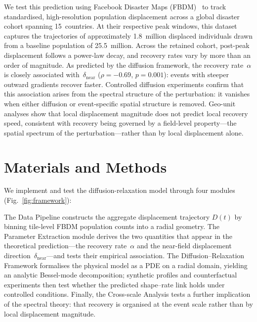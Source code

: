 \documentclass[11pt]{article}
\newcommand{\dnear}{\delta_{\mathrm{near}}}
\newcommand{\rhosp}{\rho}
\begin{document}
We test this prediction using Facebook Disaster Maps (FBDM)~\citep{Maas2019,Jia2020} to track standardised, high-resolution population displacement across a global disaster cohort spanning 15~countries. At their respective peak windows, this dataset captures the trajectories of approximately 1.8~million displaced individuals drawn from a baseline population of 25.5~million. Across the retained cohort, post-peak displacement follows a power-law decay, and recovery rates vary by more than an order of magnitude. As predicted by the diffusion framework, the recovery rate~$\alpha$ is closely associated with~$\dnear$ ($\rhosp = -0.69$, $p = 0.001$): events with steeper outward gradients recover faster. Controlled diffusion experiments confirm that this association arises from the spectral structure of the perturbation: it vanishes when either diffusion or event-specific spatial structure is removed. Geo-unit analyses show that local displacement magnitude does not predict local recovery speed, consistent with recovery being governed by a field-level property---the spatial spectrum of the perturbation---rather than by local displacement alone.


\section*{Materials and Methods}


We implement and test the diffusion-relaxation model through four modules (Fig.~\ref{fig:framework}):

The Data Pipeline constructs the aggregate displacement trajectory $D(t)$ by binning tile-level FBDM population counts into a radial geometry.
The Parameter Extraction module derives the two quantities that appear in the theoretical prediction---the recovery rate~$\alpha$ and the near-field displacement direction~$\dnear$---and tests their empirical association.
The Diffusion--Relaxation Framework formalises the physical model as a PDE on a radial domain, yielding an analytic Bessel-mode decomposition; synthetic profiles and counterfactual experiments then test whether the predicted shape--rate link holds under controlled conditions.
Finally, the Cross-scale Analysis tests a further implication of the spectral theory: that recovery is organised at the event scale rather than by local displacement magnitude.
\end{document}
